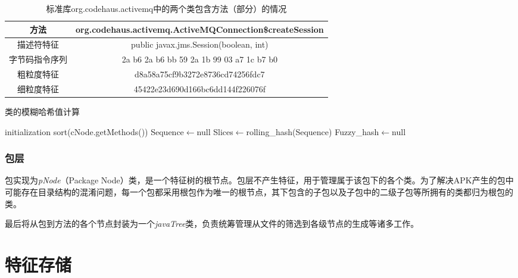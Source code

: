 \begin{table}[!hpt]
  \caption{标准库org.codehaus.activemq中的两个类包含方法（部分）的情况}
  \label{tab:activemq}
  \centering
  \begin{tabular}{cc} \toprule
    方法 & org.codehaus.activemq.ActiveMQConnection\$createSession  \\ \midrule
    描述符特征 & public javax.jms.Session(boolean, int)  \\ 
    字节码指令序列 & 2a b6 2a b6 bb 59 2a 1b 99 03 a7 1c b7 b0 \\
    粗粒度特征 & d8a58a75cf9b3272e8736cd74256fdc7 \\
    细粒度特征 &  45422e23d690d166bc6dd144f226076f \\ \bottomrule
  \end{tabular}
\end{table}


\begin{algorithm}[htb]
  \caption{类的模糊哈希值计算}
  \label{algo:fuzzyhash}
  \small
  \SetAlgoLined

  initialization\;
  sort(cNode.getMethods())\;
  Sequence$\leftarrow$null\;
  Slices$\leftarrow$rolling\_hash(Sequence)\;
  Fuzzy\_hash$\leftarrow$null\;

\end{algorithm}


\subsubsection{包层}

包实现为\textit{pNode}（Package Node）类，是一个特征树的根节点。包层不产生特征，用于管理属于该包下的各个类。为了解决APK产生的包中可能存在目录结构的混淆问题，每一个包都采用根包作为唯一的根节点，其下包含的子包以及子包中的二级子包等所拥有的类都归为根包的类。

最后将从包到方法的各个节点封装为一个\textit{javaTree}类，负责统筹管理从文件的筛选到各级节点的生成等诸多工作。



\section{特征存储}

